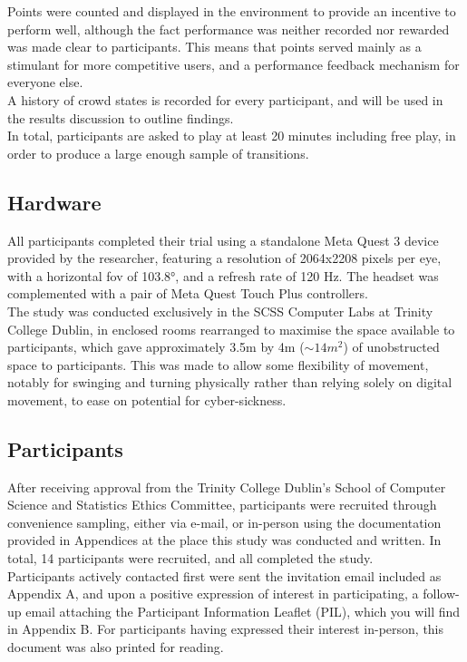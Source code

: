 Points were counted and displayed in the environment to provide an incentive to perform well, although the fact performance was neither recorded nor rewarded was made clear to participants. This means that points served mainly as a stimulant for more competitive users, and a performance feedback mechanism for everyone else.\\
A history of crowd states is recorded for every participant, and will be used in the results discussion to outline findings.\\

In total, participants are asked to play at least 20 minutes including free play, in order to produce a large enough sample of transitions.

\subsection{Hardware}
\label{subsec::design-hardware}

All participants completed their trial using a standalone Meta Quest 3 device provided by the researcher, featuring a resolution of 2064x2208 pixels per eye, with a horizontal \gls{fov} of 103.8°, and a refresh rate of 120 Hz. The headset was complemented with a pair of Meta Quest Touch Plus controllers.\\
The study was conducted exclusively in the SCSS Computer Labs at Trinity College Dublin, in enclosed rooms rearranged to maximise the space available to participants, which gave approximately 3.5m by 4m ($\sim 14m^2$) of unobstructed space to participants. This was made to allow some flexibility of movement, notably for swinging and turning physically rather than relying solely on digital movement, to ease on potential for cyber-sickness.

\subsection{Participants}

After receiving approval from the Trinity College Dublin's School of Computer Science and Statistics Ethics Committee, participants were recruited through convenience sampling, either via e-mail, or in-person using the documentation provided in Appendices at the place this study was conducted and written. In total, 14 participants were recruited, and all completed the study.\\
Participants actively contacted first were sent the invitation email included as Appendix A, and upon a positive expression of interest in participating, a follow-up email attaching the Participant Information Leaflet (PIL), which you will find in Appendix B. For participants having expressed their interest in-person, this document was also printed for reading.\\

